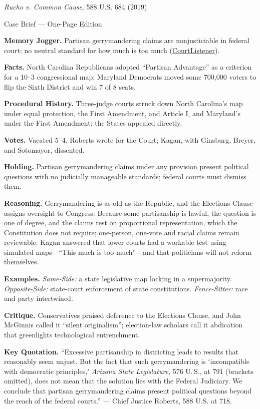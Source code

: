 \documentclass[12pt]{article}
\begin{document}
\begin{center}
{\Large \textit{Rucho v. Common Cause}, 588 U.S. 684 (2019)\par}
\vspace{0.3em}
{\normalsize Case Brief --- One-Page Edition\par}
\end{center}

\textbf{Memory Jogger.} Partisan gerrymandering claims are nonjusticiable in federal court: no neutral standard for how much is too much (\href{https://www.courtlistener.com/opinion/4633469/rucho-v-common-cause/}{CourtListener}).

\textbf{Facts.} North Carolina Republicans adopted ``Partisan Advantage'' as a criterion for a 10--3 congressional map; Maryland Democrats moved some 700,000 voters to flip the Sixth District and win 7 of 8 seats.

\textbf{Procedural History.} Three-judge courts struck down North Carolina's map under equal protection, the First Amendment, and Article I, and Maryland's under the First Amendment; the States appealed directly.

\textbf{Votes.} Vacated 5--4. Roberts wrote for the Court; Kagan, with Ginsburg, Breyer, and Sotomayor, dissented.

\textbf{Holding.} Partisan gerrymandering claims under any provision present political questions with no judicially manageable standards; federal courts must dismiss them.

\textbf{Reasoning.} Gerrymandering is as old as the Republic, and the Elections Clause assigns oversight to Congress. Because some partisanship is lawful, the question is one of degree, and the claims rest on proportional representation, which the Constitution does not require; one-person, one-vote and racial claims remain reviewable. Kagan answered that lower courts had a workable test using simulated maps---``This much is too much''---and that politicians will not reform themselves.

\textbf{Examples.} \emph{Same-Side:} a state legislative map locking in a supermajority. \emph{Opposite-Side:} state-court enforcement of state constitutions. \emph{Fence-Sitter:} race and party intertwined.

\textbf{Critique.} Conservatives praised deference to the Elections Clause, and John McGinnis called it ``silent originalism''; election-law scholars call it abdication that greenlights technological entrenchment.

\textbf{Key Quotation.} ``Excessive partisanship in districting leads to results that reasonably seem unjust. But the fact that such gerrymandering is `incompatible with democratic principles,' \textit{Arizona State Legislature}, 576 U.\,S., at 791 (brackets omitted), does not mean that the solution lies with the Federal Judiciary. We conclude that partisan gerrymandering claims present political questions beyond the reach of the federal courts.'' --- Chief Justice Roberts, 588 U.S. at 718.
\end{document}
